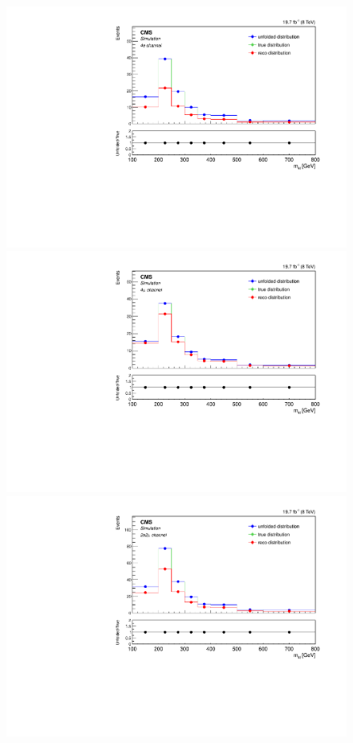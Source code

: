 \begin{figure}[hbtp]
  \begin{center}
    \includegraphics[width=0.8\cmsFigWidth]{Figures/Unfolding/MCTests/Mass_ZZTo4e_MadMatrix_MadDistr_FullSample_fr}     
    \includegraphics[width=0.8\cmsFigWidth]{Figures/Unfolding/MCTests/Mass_ZZTo4m_MadMatrix_MadDistr_FullSample_fr}     
    \includegraphics[width=0.8\cmsFigWidth]{Figures/Unfolding/MCTests/Mass_ZZTo2e2m_MadMatrix_MadDistr_FullSample_fr}

\end{center}
\end{figure}

